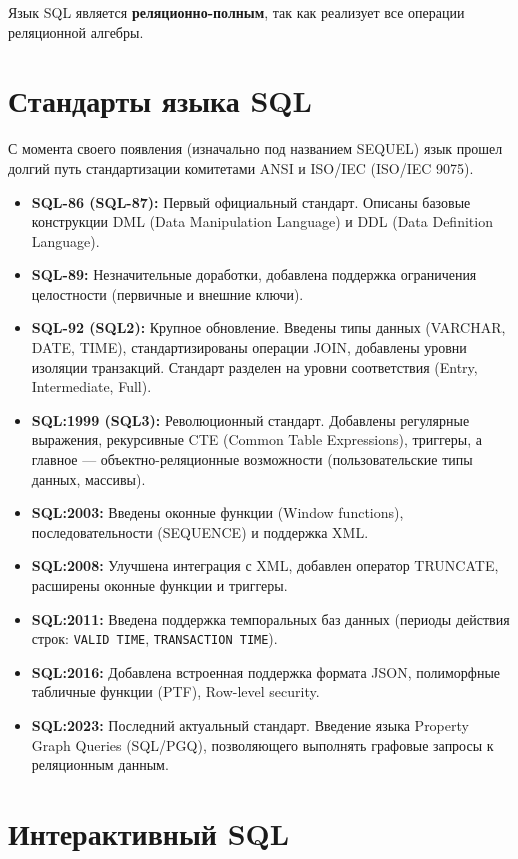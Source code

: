 \documentclass[12pt, a4paper]{article}
\begin{document}
Язык SQL является \textbf{реляционно-полным}, так как реализует все операции реляционной алгебры.

\section{Стандарты языка SQL}

С момента своего появления (изначально под названием SEQUEL) язык прошел долгий путь стандартизации комитетами ANSI и ISO/IEC (ISO/IEC 9075).

\begin{itemize}
    \item \textbf{SQL-86 (SQL-87):} Первый официальный стандарт. Описаны базовые конструкции DML (Data Manipulation Language) и DDL (Data Definition Language).
    \item \textbf{SQL-89:} Незначительные доработки, добавлена поддержка ограничения целостности (первичные и внешние ключи).
    \item \textbf{SQL-92 (SQL2):} Крупное обновление. Введены типы данных (VARCHAR, DATE, TIME), стандартизированы операции JOIN, добавлены уровни изоляции транзакций. Стандарт разделен на уровни соответствия (Entry, Intermediate, Full).
    \item \textbf{SQL:1999 (SQL3):} Революционный стандарт. Добавлены регулярные выражения, рекурсивные CTE (Common Table Expressions), триггеры, а главное — объектно-реляционные возможности (пользовательские типы данных, массивы).
    \item \textbf{SQL:2003:} Введены оконные функции (Window functions), последовательности (SEQUENCE) и поддержка XML.
    \item \textbf{SQL:2008:} Улучшена интеграция с XML, добавлен оператор TRUNCATE, расширены оконные функции и триггеры.
    \item \textbf{SQL:2011:} Введена поддержка темпоральных баз данных (периоды действия строк: \texttt{VALID TIME}, \texttt{TRANSACTION TIME}).
    \item \textbf{SQL:2016:} Добавлена встроенная поддержка формата JSON, полиморфные табличные функции (PTF), Row-level security.
    \item \textbf{SQL:2023:} Последний актуальный стандарт. Введение языка Property Graph Queries (SQL/PGQ), позволяющего выполнять графовые запросы к реляционным данным.
\end{itemize}

\section{Интерактивный SQL}
\end{document}
